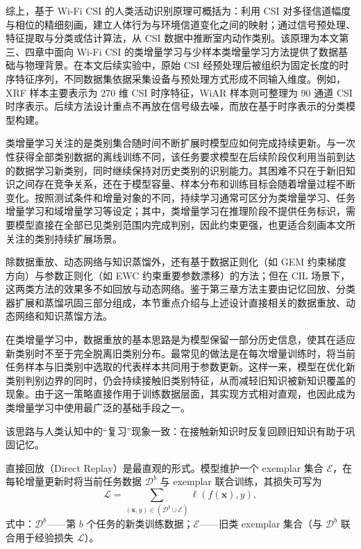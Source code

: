 综上，基于 Wi-Fi CSI 的人类活动识别原理可概括为：利用 CSI 对多径信道幅度与相位的精细刻画，建立人体行为与环境信道变化之间的映射；通过信号预处理、特征提取与分类或估计算法，从 CSI 数据中推断室内动作类别。该原理为本文第三、四章中面向 Wi-Fi CSI 的类增量学习与少样本类增量学习方法提供了数据基础与物理背景。在本文后续实验中，原始 CSI 经预处理后被组织为固定长度的时序特征序列，不同数据集依据采集设备与预处理方式形成不同输入维度。例如，XRF 样本主要表示为 270 维 CSI 时序特征，WiAR 样本则可整理为 90 通道 CSI 时序表示。后续方法设计重点不再放在信号级去噪，而放在基于时序表示的分类模型构建。



类增量学习关注的是类别集合随时间不断扩展时模型应如何完成持续更新。与一次性获得全部类别数据的离线训练不同，该任务要求模型在后续阶段仅利用当前到达的数据学习新类别，同时继续保持对历史类别的识别能力。其困难不只在于新旧知识之间存在竞争关系，还在于模型容量、样本分布和训练目标会随着增量过程不断变化。按照测试条件和增量对象的不同，持续学习通常可区分为类增量学习、任务增量学习和域增量学习等设定；其中，类增量学习在推理阶段不提供任务标识，需要模型直接在全部已见类别范围内完成判别，因此约束更强，也更适合刻画本文所关注的类别持续扩展场景\cite{zhou2024cil}。

除数据重放、动态网络与知识蒸馏外，还有基于数据正则化（如 GEM\cite{lopezpaz2017gem} 约束梯度方向）与参数正则化（如 EWC\cite{kirkpatrick2017ewc} 约束重要参数漂移）的方法；但在 CIL 场景下，这两类方法的效果多不如回放与动态网络\cite{zhou2024cil}。鉴于第三章方法主要由记忆回放、分类器扩展和蒸馏巩固三部分组成，本节重点介绍与上述设计直接相关的数据重放、动态网络和知识蒸馏方法。


在类增量学习中，数据重放的基本思路是为模型保留一部分历史信息，使其在适应新类别时不至于完全脱离旧类别分布。最常见的做法是在每次增量训练时，将当前任务样本与旧类别中选取的代表样本共同用于参数更新。这样一来，模型在优化新类别判别边界的同时，仍会持续接触旧类别特征，从而减轻旧知识被新知识覆盖的现象。由于这一策略直接作用于训练数据层面，其实现方式相对直观，也因此成为类增量学习中使用最广泛的基础手段之一\cite{zhou2024cil}。

该思路与人类认知中的“复习”现象一致：在接触新知识时反复回顾旧知识有助于巩固记忆\cite{zhou2024cil}。

直接回放（Direct Replay）是最直观的形式。模型维护一个 exemplar 集合 $\mathcal{E}$，在每轮增量更新时将当前任务数据 $\mathcal{D}^b$ 与 exemplar 联合训练，其损失可写为
\begin{equation}\label{eq:ch2-replay-loss}
  \mathcal{L} = \sum_{(\mathbf{x}, y) \in (\mathcal{D}^b \cup \mathcal{E})} \ell(f(\mathbf{x}), y),
  \tag{2-3}
\end{equation}
\noindent 式中：$\mathcal{D}^b$——第 $b$ 个任务的新类训练数据；$\mathcal{E}$——旧类 exemplar 集合（与 $\mathcal{D}^b$ 联合用于经验损失 $\mathcal{L}$）。

